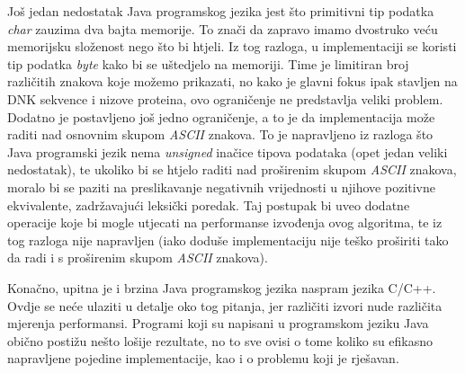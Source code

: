 Još jedan nedostatak Java programskog jezika jest što primitivni tip podatka \textit{char} zauzima dva bajta memorije. To znači da zapravo imamo dvostruko veću memorijsku složenost nego što bi htjeli. Iz tog razloga, u implementaciji se koristi tip podatka \textit{byte} kako bi se uštedjelo na memoriji. Time je limitiran broj različitih znakova koje možemo prikazati, no kako je glavni fokus ipak stavljen na DNK sekvence i nizove proteina, ovo ograničenje ne predstavlja veliki problem. Dodatno je postavljeno još jedno ograničenje, a to je da implementacija može raditi nad osnovnim skupom \textit{ASCII} znakova. To je napravljeno iz razloga što Java programski jezik nema \textit{unsigned} inačice tipova podataka (opet jedan veliki nedostatak), te ukoliko bi se htjelo raditi nad proširenim skupom \textit{ASCII} znakova, moralo bi se paziti na preslikavanje negativnih vrijednosti u njihove pozitivne ekvivalente, zadržavajući leksički poredak. Taj postupak bi uveo dodatne operacije koje bi mogle utjecati na performanse izvođenja ovog algoritma, te iz tog razloga nije napravljen (iako doduše implementaciju nije teško proširiti tako da radi i s proširenim skupom \textit{ASCII} znakova). 

Konačno, upitna je i brzina Java programskog jezika naspram jezika C/C++. Ovdje se neće ulaziti u detalje oko tog pitanja, jer različiti izvori nude različita mjerenja performansi. Programi koji su napisani u programskom jeziku Java obično postižu nešto lošije rezultate, no to sve ovisi o tome koliko su efikasno napravljene pojedine implementacije, kao i o problemu koji je rješavan. 



